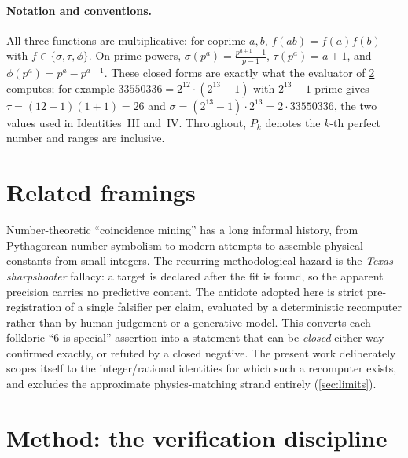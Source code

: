 \documentclass[11pt,a4paper]{article}
\newcommand{\sig}{\sigma}
\theoremstyle{definition}
\begin{document}
\paragraph{Notation and conventions.} All three functions are multiplicative: for coprime $a,b$, $f(ab)=f(a)f(b)$ with $f\in\{\sig,\tau,\phi\}$. On prime powers, $\sig(p^a)=\frac{p^{a+1}-1}{p-1}$, $\tau(p^a)=a+1$, and $\phi(p^a)=p^a-p^{a-1}$. These closed forms are exactly what the evaluator of \textsection\ref{sec:method} computes; for example $33550336=2^{12}\cdot(2^{13}-1)$ with $2^{13}-1$ prime gives $\tau=(12+1)(1+1)=26$ and $\sig=(2^{13}-1)\cdot 2^{13}=2\cdot 33550336$, the two values used in Identities~III and~IV. Throughout, $P_k$ denotes the $k$-th perfect number and ranges are inclusive.

\section{Related framings}
\label{sec:related}
Number-theoretic ``coincidence mining'' has a long informal history, from Pythagorean number-symbolism to modern attempts to assemble physical constants from small integers. The recurring methodological hazard is the \emph{Texas-sharpshooter} fallacy: a target is declared after the fit is found, so the apparent precision carries no predictive content. The antidote adopted here is strict pre-registration of a single falsifier per claim, evaluated by a deterministic recomputer rather than by human judgement or a generative model. This converts each folkloric ``$6$ is special'' assertion into a statement that can be \emph{closed} either way --- confirmed exactly, or refuted by a closed negative. The present work deliberately scopes itself to the integer/rational identities for which such a recomputer exists, and excludes the approximate physics-matching strand entirely (\textsection\ref{sec:limits}).

\section{Method: the verification discipline}
\label{sec:method}
\end{document}
